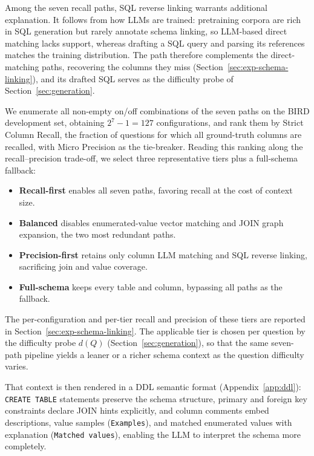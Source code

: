 Among the seven recall paths, SQL reverse linking warrants additional explanation. It
follows from how LLMs are trained: pretraining corpora are rich in SQL generation but
rarely annotate schema linking, so LLM-based direct matching lacks support, whereas
drafting a SQL query and parsing its references matches the training distribution. The
path therefore complements the direct-matching paths, recovering the columns they miss
(Section~\ref{sec:exp-schema-linking}), and its drafted SQL serves as the difficulty probe
of Section~\ref{sec:generation}.

We enumerate all non-empty on/off combinations of the seven paths on the BIRD
development set, obtaining $2^{7}-1=127$ configurations, and rank them by Strict Column
Recall, the fraction of questions for which all ground-truth columns are recalled, with
Micro Precision as the tie-breaker. Reading this ranking along the recall--precision
trade-off, we select three representative tiers plus a full-schema fallback:

\begingroup
\setlength{\topsep}{6pt}
\setlength{\partopsep}{0pt}
\begin{itemize}
  \setlength{\itemsep}{1pt}
  \setlength{\parsep}{0pt}
  \item \textbf{Recall-first} enables all seven paths, favoring recall at the cost of
    context size.
  \item \textbf{Balanced} disables enumerated-value vector matching and JOIN graph
    expansion, the two most redundant paths.
  \item \textbf{Precision-first} retains only column LLM matching and SQL reverse linking,
    sacrificing join and value coverage.
  \item \textbf{Full-schema} keeps every table and column, bypassing all paths as the
    fallback.
\end{itemize}
\endgroup

The per-configuration and per-tier recall and precision of these tiers are reported in
Section~\ref{sec:exp-schema-linking}. The applicable tier is chosen per question by the
difficulty probe $d(Q)$ (Section~\ref{sec:generation}), so that the same seven-path
pipeline yields a leaner or a richer schema context as the question difficulty varies.

That context is then rendered in a DDL semantic format (Appendix~\ref{app:ddl}):
\texttt{CREATE TABLE} statements preserve the schema structure, primary and foreign key
constraints declare JOIN hints explicitly, and column comments embed descriptions, value
samples (\texttt{Examples}), and matched enumerated values with explanation
(\texttt{Matched values}), enabling the LLM to interpret the schema more completely.

